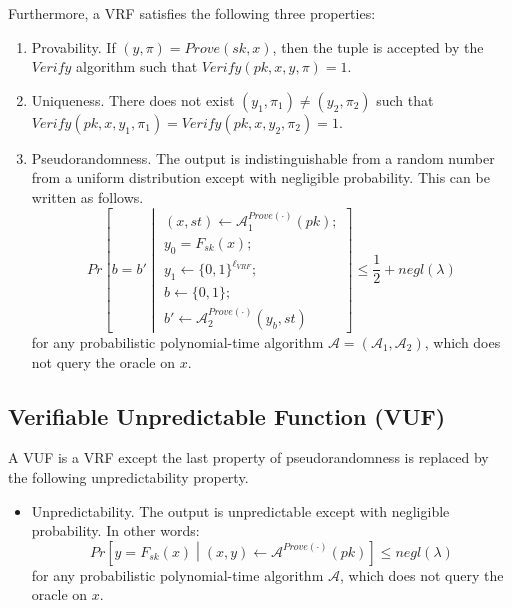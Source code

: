 \documentclass[letterpaper,twocolumn,10pt]{article}
\theoremstyle{definition}
\theoremstyle{remark}
\begin{document}
Furthermore, a VRF satisfies the following three properties:
\begin{enumerate}
\item Provability. If $(y, \pi) = Prove(sk, x)$, then the tuple is accepted by the $Verify$ algorithm such that $Verify(pk, x, y, \pi) = 1$.
\item Uniqueness. There does not exist $(y_1, \pi_1) \neq (y_2, \pi_2)$ such that $Verify(pk, x, y_1, \pi_1) = Verify(pk, x, y_2, \pi_2) = 1$.
\item Pseudorandomness. The output is indistinguishable from a random number from a uniform distribution except with negligible probability. This can be written as follows.
\[
Pr\left[b = b' \middle\vert \begin{array}{l}
(x, st) \leftarrow \mathcal{A}^{Prove(\cdot)}_{1}(pk);\\
y_0 = F_{sk}(x);\\
y_1 \leftarrow \{0, 1\}^{\ell_{VRF}};\\
b \leftarrow \{0, 1\};\\
b' \leftarrow \mathcal{A}^{Prove(\cdot)}_{2}(y_b, st)
\end{array}\right] \leq \frac{1}{2} + negl(\lambda)
\]
for any probabilistic polynomial-time algorithm $\mathcal{A} = (\mathcal{A}_1, \mathcal{A}_2)$, which does not query the oracle on $x$.
\end{enumerate}

\subsection{Verifiable Unpredictable Function (VUF)}
\label{appendix:vuf}
A VUF \cite{micali1999verifiable,dodis2005verifiable} is a VRF except the last property of pseudorandomness is replaced by the following unpredictability property.
\begin{itemize}
\item Unpredictability. The output is unpredictable except with negligible probability. In other words:
\[
Pr\left[y = F_{sk}(x) \middle\vert (x, y) \leftarrow \mathcal{A}^{Prove(\cdot)}(pk)\right] \leq negl(\lambda)
\]
for any probabilistic polynomial-time algorithm $\mathcal{A}$, which does not query the oracle on $x$.
\end{itemize}
\end{document}
